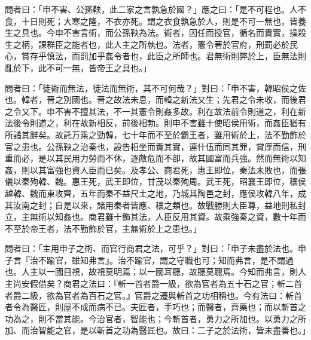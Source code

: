 
\begin{pinyinscope}
問者曰：「申不害、公孫鞅，此二家之言孰急於國？」應之曰：「是不可程也。人不食，十日則死；大寒之隆，不衣亦死。謂之衣食孰急於人，則是不可一無也，皆養生之具也。今申不害言術，而公孫鞅為法。術者，因任而授官，循名而責實，操殺生之柄，課群臣之能者也，此人主之所執也。法者，憲令著於官府，刑罰必於民心，賞存乎慎法，而罰加乎姦令者也，此臣之所師也。君無術則弊於上，臣無法則亂於下，此不可一無，皆帝王之具也。」

問者曰：「徒術而無法，徒法而無術，其不可何哉？」對曰：「申不害，韓昭侯之佐也。韓者，晉之別國也。晉之故法未息，而韓之新法又生；先君之令未收，而後君之令又下。申不害不擅其法，不一其憲令則姦多故。利在故法前令則道之，利在新法後令則道之，利在故新相反，前後相勃。則申不害雖十使昭侯用術，而姦臣猶有所譎其辭矣。故託万乘之勁韓，七十年而不至於霸王者，雖用術於上，法不勤飾於官之患也。公孫鞅之治秦也，設告相坐而責其實，連什伍而同其罪，賞厚而信，刑重而必，是以其民用力勞而不休，逐敵危而不卻，故其國富而兵強。然而無術以知姦，則以其富強也資人臣而已矣。及孝公、商君死，惠王即位，秦法未敗也，而張儀以秦殉韓、魏。惠王死，武王即位，甘茂以秦殉周。武王死，昭襄王即位，穰侯越韓、魏而東攻齊，五年而秦不益尺土之地，乃城其陶邑之封，應侯攻韓八年，成其汝南之封；自是以來，諸用秦者皆應、穰之類也。故戰勝則大臣尊，益地則私封立，主無術以知姦也。商君雖十飾其法，人臣反用其資。故乘強秦之資，數十年而不至於帝王者，法不勤飾於官，主無術於上之患也。」

問者曰：「主用申子之術、而官行商君之法，可乎？」對曰：「申子未盡於法也。申子言『治不踰官，雖知弗言』。治不踰官，謂之守職也可；知而弗言，是不謂過也。人主以一國目視，故視莫明焉；以一國耳聽，故聽莫聰焉。今知而弗言，則人主尚安假借矣？商君之法曰：『斬一首者爵一級，欲為官者為五十石之官；斬二首者爵二級，欲為官者為百石之官。』官爵之遷與斬首之功相稱也。今有法曰：斬首者令為醫匠，則屋不成而病不已。夫匠者，手巧也；而醫者，齊藥也；而以斬首之功為之，則不當其能。今治官者，智能也；今斬首者，勇力之所加也。以勇力之所加、而治智能之官，是以斬首之功為醫匠也。故曰：二子之於法術，皆未盡善也。」


\end{pinyinscope}
